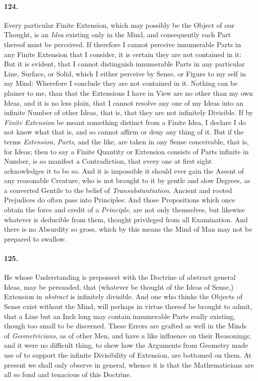 \documentclass[]{article}
\newenvironment{sectionbody}{}{}
\begin{document}
\begin{sectionbody}
\paragraph{124.} Every particular Finite Extension, which may possibly be the
Object of our Thought, is an \emph{Idea} existing only in the
Mind, and consequently each Part thereof must be perceived.  If
therefore I cannot perceive innumerable Parts in any Finite
Extension that I consider, it is certain they are not contained
in it: But it is evident, that I cannot distinguish innumerable
Parts in any particular Line, Surface, or Solid, which I either
perceive by Sense, or Figure to my self in my Mind: Wherefore I
conclude they are not contained in it.  Nothing can be plainer to
me, than that the Extensions I have in View are no other than my
own Ideas, and it is no less plain, that I cannot resolve any one
of my Ideas into an infinite Number of other Ideas, that is, that
they are not infinitely Divisible.  If by \emph{Finite
Extension} be meant something distinct from a Finite Idea, I
declare I do not know what that is, and so cannot affirm or deny
any thing of it.  But if the terms \emph{Extension},
\emph{Parts}, and the like, are taken in any Sense conceivable,
that is, for Ideas; then to say a Finite Quantity or Extension
consists of Parts infinite in Number, is so manifest a
Contradiction, that every one at first sight acknowledges it to
be so.  And it is impossible it should ever gain the Assent of
any reasonable Creature, who is not brought to it by gentle and
slow Degrees, as a converted Gentile to the belief of
\emph{Transubstantiation}.  Ancient and rooted Prejudices do
often pass into Principles: And those Propositions which once
obtain the force and credit of a \emph{Principle}, are not only
themselves, but likewise whatever is deducible from them, thought
privileged from all Examination.  And there is no Absurdity so
gross, which by this means the Mind of Man may not be prepared to
swallow.



\paragraph{125.} He whose Understanding is prepossest with the Doctrine of
abstract general Ideas, may be persuaded, that (whatever be
thought of the Ideas of Sense,) Extension in \emph{abstract} is
infinitely divisible.  And one who thinks the Objects of Sense
exist without the Mind, will perhaps in virtue thereof be brought
to admit, that a Line but an Inch long may contain innumerable
Parts really existing, though too small to be discerned.  These
Errors are grafted as well in the Minds of
\emph{Geometricians}, as of other Men, and have a like influence
on their Reasonings; and it were no difficult thing, to shew how
the Arguments from Geometry made use of to support the infinite
Divisibility of Extension, are bottomed on them.  At present we
shall only observe in general, whence it is that the
Mathematicians are all so fond and tenacious of this Doctrine.




\end{sectionbody}
\end{document}

